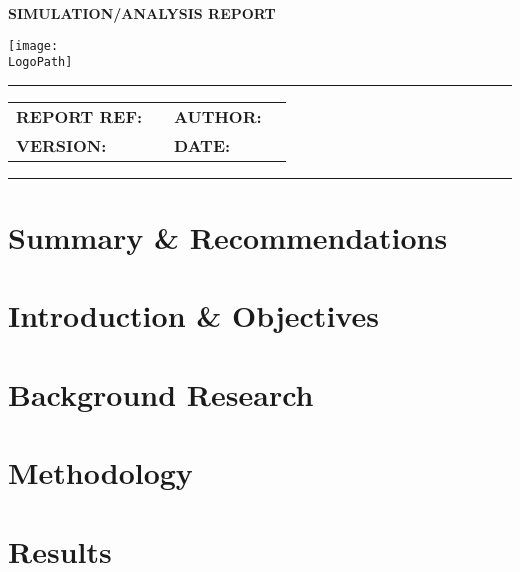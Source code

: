 \documentclass[10pt]{article}
\makeatletter
\newcommand{\customtitle}{%
  \noindent
  \begin{minipage}[t]{0.65\textwidth}
    \vspace{-0.5cm}
    {\ocrfamily\Large\bfseries SIMULATION/ANALYSIS REPORT \par} 
  \end{minipage}%
  \begin{minipage}[t]{0.35\textwidth}
    \flushright{}
    \texttt{[image: \\LogoPath]}
  \end{minipage}

  \vspace{0.3cm}
  \hrule height 0.8pt
  \vspace{0.3cm}

  {\ocrfamily\bfseries\ProjectFullRef\par}
  {\ocrfamily\large\bfseries\ReportTitle\par}

  \vspace{0.5em}

  \begin{tabular}{@{}ll@{\hspace{2cm}}ll@{}}
    \ocrfamily\textbf{REPORT REF:} & \ocrfamily \ReportRef &
    \ocrfamily\textbf{AUTHOR:}     & \ocrfamily \AuthorName \\

    \ocrfamily\textbf{VERSION:}    & \ocrfamily \DocVersion &
    \ocrfamily\textbf{DATE:}       & \ocrfamily \ReleaseDate \\
  \end{tabular}

  \vspace{0.3cm}
  \hrule height 0.8pt
  \vspace{0.25cm}
}
\makeatother
\begin{document}
\vspace*{-1cm}
\thispagestyle{plain}
\customtitle{}



\section{Summary \& Recommendations}

\section{Introduction \& Objectives}

\section{Background Research}

\section{Methodology}

\section{Results}
\end{document}
